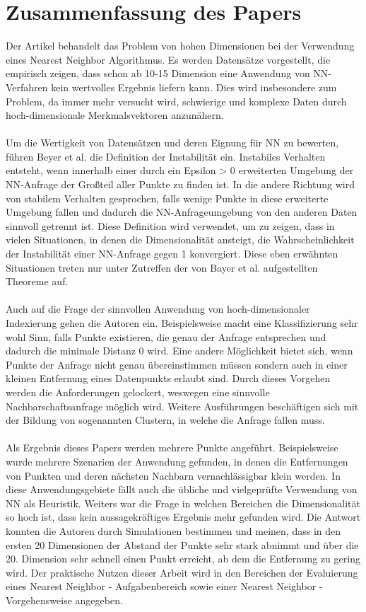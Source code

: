 \documentclass{article}
\begin{document}
\section{Zusammenfassung des Papers}
Der Artikel behandelt das Problem von hohen Dimensionen bei der Verwendung eines Nearest Neighbor Algorithmus. Es werden Datensätze vorgestellt, die empirisch zeigen, dass schon ab 10-15 Dimension eine Anwendung von NN-Verfahren kein wertvolles Ergebnis liefern kann. Dies wird insbesondere zum Problem, da immer mehr versucht wird, schwierige und komplexe Daten durch hoch-dimensionale Merkmalsvektoren anzunähern.  
\\
\\
Um die Wertigkeit von Datensätzen und deren Eignung für NN zu bewerten, führen Beyer et al. die Definition der Instabilität ein. Instabiles Verhalten entsteht, wenn innerhalb einer durch ein Epsilon > 0 erweiterten Umgebung der NN-Anfrage der Großteil aller Punkte zu finden ist. In die andere Richtung wird von stabilem Verhalten gesprochen, falls wenige Punkte in diese erweiterte Umgebung fallen und dadurch die NN-Anfrageumgebung von den anderen Daten sinnvoll getrennt ist. 
Diese Definition wird verwendet, um zu zeigen, dass in vielen Situationen, in denen die Dimensionalität ansteigt, die Wahrscheinlichkeit der Instabilität einer NN-Anfrage gegen 1 konvergiert. Diese eben erwähnten Situationen treten nur unter Zutreffen der von Bayer et al. aufgestellten Theoreme auf.
\\
\\
Auch auf die Frage der sinnvollen Anwendung von hoch-dimensionaler Indexierung gehen die Autoren ein. Beispielsweise macht eine Klassifizierung sehr wohl Sinn, falls Punkte existieren, die genau der Anfrage entsprechen und dadurch die minimale Distanz 0 wird. Eine andere Möglichkeit bietet sich, wenn Punkte der Anfrage nicht genau übereinstimmen müssen sondern auch in einer kleinen Entfernung eines Datenpunkts erlaubt sind. Durch dieses Vorgehen werden die Anforderungen gelockert, weswegen eine sinnvolle Nachbarschaftsanfrage möglich wird. Weitere Ausführungen beschäftigen sich mit der Bildung von sogenannten Clustern, in welche die Anfrage fallen muss.
\\
\\
Als Ergebnis dieses Papers werden mehrere Punkte angeführt. Beispielsweise wurde mehrere Szenarien der Anwendung gefunden, in denen die Entfernungen von Punkten und deren nächsten Nachbarn vernachlässigbar klein werden. In diese Anwendungsgebiete fällt auch die übliche und vielgeprüfte Verwendung von NN als Heuristik. 
Weiters war die Frage in welchen Bereichen die Dimensionalität so hoch ist, dass kein aussagekräftiges Ergebnis mehr gefunden wird. Die Antwort konnten die Autoren durch Simulationen bestimmen und meinen, dass in den ersten 20 Dimensionen der Abstand der Punkte sehr stark abnimmt und über die 20. Dimension sehr schnell einen Punkt erreicht, ab dem die Entfernung zu gering wird. 
Der praktische Nutzen dieser Arbeit wird in den Bereichen der Evaluierung eines Nearest Neighbor - Aufgabenbereich sowie einer Nearest Neighbor - Vorgehensweise angegeben. 
\end{document}
